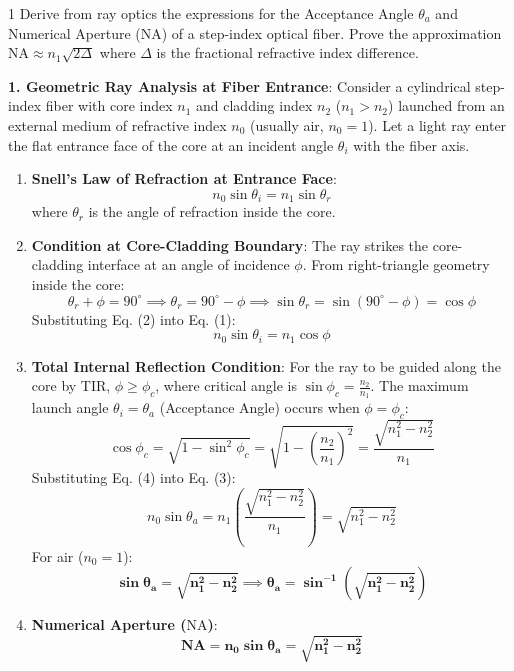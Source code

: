 \begin{theoryq}{1}
Derive from ray optics the expressions for the Acceptance Angle $\theta_a$ and Numerical Aperture ($\text{NA}$) of a step-index optical fiber. Prove the approximation $\text{NA} \approx n_1\sqrt{2\Delta}$ where $\Delta$ is the fractional refractive index difference.
\end{theoryq}
\begin{theorysol}
\textbf{1. Geometric Ray Analysis at Fiber Entrance}:
Consider a cylindrical step-index fiber with core index $n_1$ and cladding index $n_2$ ($n_1 > n_2$) launched from an external medium of refractive index $n_0$ (usually air, $n_0 = 1$).
Let a light ray enter the flat entrance face of the core at an incident angle $\theta_i$ with the fiber axis.
\begin{enumerate}
    \item \textbf{Snell's Law of Refraction at Entrance Face}:
    \begin{equation}
    n_0 \sin\theta_i = n_1 \sin\theta_r
    \end{equation}
    where $\theta_r$ is the angle of refraction inside the core.
    \item \textbf{Condition at Core-Cladding Boundary}:
    The ray strikes the core-cladding interface at an angle of incidence $\phi$.
    From right-triangle geometry inside the core:
    \begin{equation}
    \theta_r + \phi = 90^\circ \implies \theta_r = 90^\circ - \phi \implies \sin\theta_r = \sin(90^\circ - \phi) = \cos\phi
    \end{equation}
    Substituting Eq. (2) into Eq. (1):
    \begin{equation}
    n_0 \sin\theta_i = n_1 \cos\phi
    \end{equation}
    \item \textbf{Total Internal Reflection Condition}:
    For the ray to be guided along the core by TIR, $\phi \ge \phi_c$, where critical angle is $\sin\phi_c = \frac{n_2}{n_1}$.
    The maximum launch angle $\theta_i = \theta_a$ (Acceptance Angle) occurs when $\phi = \phi_c$:
    \begin{equation}
    \cos\phi_c = \sqrt{1 - \sin^2\phi_c} = \sqrt{1 - \left(\frac{n_2}{n_1}\right)^2} = \frac{\sqrt{n_1^2 - n_2^2}}{n_1}
    \end{equation}
    Substituting Eq. (4) into Eq. (3):
    \begin{equation}
    n_0 \sin\theta_a = n_1 \left( \frac{\sqrt{n_1^2 - n_2^2}}{n_1} \right) = \sqrt{n_1^2 - n_2^2}
    \end{equation}
    For air ($n_0 = 1$):
    \begin{equation}
    \mathbf{\sin\theta_a = \sqrt{n_1^2 - n_2^2} \implies \theta_a = \sin^{-1}\left(\sqrt{n_1^2 - n_2^2}\right)}
    \end{equation}
    \item \textbf{Numerical Aperture ($\text{NA}$)}:
    \begin{equation}
    \mathbf{\text{NA} = n_0 \sin\theta_a = \sqrt{n_1^2 - n_2^2}}
    \end{equation}
\end{enumerate}


\end{theorysol}
